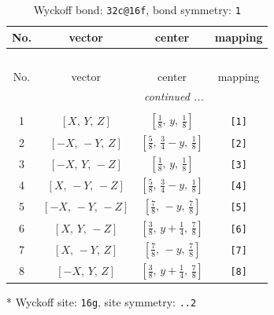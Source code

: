 \documentclass[fleqn,8pt]{jsarticle}
\begin{document}
\renewcommand{\arraystretch}{1.2}
\begin{longtable}{cccc}
\caption{Wyckoff bond: {\tt 32c@16f}, bond symmetry: {\tt 1}}
 \\
 \hline \hline
No. & vector & center & mapping \\ \hline \endfirsthead

\multicolumn{3}{l}{\tablename\ \thetable{}} \\
 \hline \hline
No. & vector & center & mapping \\ \hline \endhead

 \hline \hline
\multicolumn{3}{r}{\footnotesize\it continued ...} \\ \endfoot

 \hline \hline
\multicolumn{3}{r}{} \\ \endlastfoot

1 & $\left[ X,\, Y,\, Z \right]$ & $\left[ \frac{1}{8},\, y,\, \frac{1}{8} \right]$ & {\tt [1]} \\ \hline
2 & $\left[ - X,\, - Y,\, Z \right]$ & $\left[ \frac{5}{8},\, \frac{3}{4} - y,\, \frac{1}{8} \right]$ & {\tt [2]} \\ \hline
3 & $\left[ - X,\, Y,\, - Z \right]$ & $\left[ \frac{1}{8},\, y,\, \frac{1}{8} \right]$ & {\tt [3]} \\ \hline
4 & $\left[ X,\, - Y,\, - Z \right]$ & $\left[ \frac{5}{8},\, \frac{3}{4} - y,\, \frac{1}{8} \right]$ & {\tt [4]} \\ \hline
5 & $\left[ - X,\, - Y,\, - Z \right]$ & $\left[ \frac{7}{8},\, - y,\, \frac{7}{8} \right]$ & {\tt [5]} \\ \hline
6 & $\left[ X,\, Y,\, - Z \right]$ & $\left[ \frac{3}{8},\, y + \frac{1}{4},\, \frac{7}{8} \right]$ & {\tt [6]} \\ \hline
7 & $\left[ X,\, - Y,\, Z \right]$ & $\left[ \frac{7}{8},\, - y,\, \frac{7}{8} \right]$ & {\tt [7]} \\ \hline
8 & $\left[ - X,\, Y,\, Z \right]$ & $\left[ \frac{3}{8},\, y + \frac{1}{4},\, \frac{7}{8} \right]$ & {\tt [8]} \\
\end{longtable}
* Wyckoff site: {\tt 16g}, site symmetry: {\tt ..2}
\renewcommand{\arraystretch}{1.2}
\end{document}
